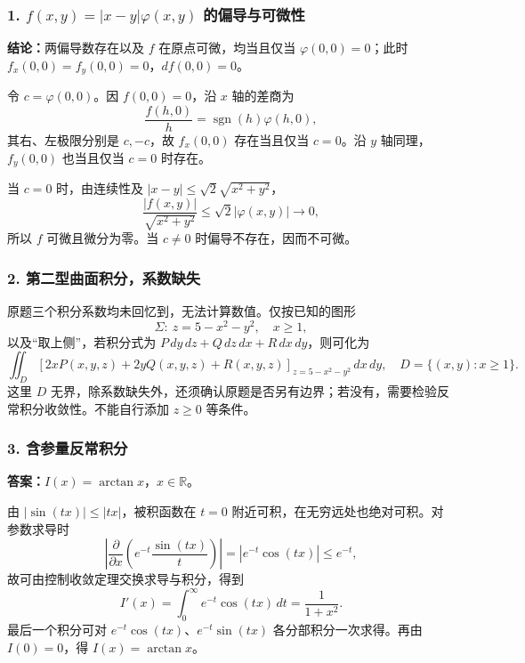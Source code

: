 \documentclass[11pt,fontset=fandol]{ctexart}
\begin{document}
\subsubsection{\texorpdfstring{1. \(f(x,y)=|x-y|\varphi(x,y)\)
的偏导与可微性}{1. f(x,y)=\textbar x-y\textbar\textbackslash varphi(x,y) 的偏导与可微性}}\label{fxyx-yvarphixy-ux7684ux504fux5bfcux4e0eux53efux5faeux6027}

\textbf{结论：}两偏导数存在以及 \(f\) 在原点可微，均当且仅当
\(\varphi(0,0)=0\)；此时 \(f_x(0,0)=f_y(0,0)=0\)，\(df(0,0)=0\)。

令 \(c=\varphi(0,0)\)。因 \(f(0,0)=0\)，沿 \(x\) 轴的差商为 \[
\frac{f(h,0)}h=\operatorname{sgn}(h)\varphi(h,0),
\] 其右、左极限分别是 \(c,-c\)，故 \(f_x(0,0)\) 存在当且仅当 \(c=0\)。沿
\(y\) 轴同理，\(f_y(0,0)\) 也当且仅当 \(c=0\) 时存在。

当 \(c=0\) 时，由连续性及 \(|x-y|\le\sqrt2\sqrt{x^2+y^2}\)， \[
\frac{|f(x,y)|}{\sqrt{x^2+y^2}}
\le\sqrt2|\varphi(x,y)|\to0,
\] 所以 \(f\) 可微且微分为零。当 \(c\ne0\) 时偏导不存在，因而不可微。

\subsubsection{2.
第二型曲面积分，系数缺失}\label{ux7b2cux4e8cux578bux66f2ux9762ux79efux5206ux7cfbux6570ux7f3aux5931}

原题三个积分系数均未回忆到，无法计算数值。仅按已知的图形 \[
\Sigma:\ z=5-x^2-y^2,\quad x\ge1,
\] 以及``取上侧''，若积分式为
\(P\,dy\,dz+Q\,dz\,dx+R\,dx\,dy\)，则可化为 \[
\iint_D[2xP(x,y,z)+2yQ(x,y,z)+R(x,y,z)]_{z=5-x^2-y^2}\,dx\,dy,
\quad D=\{(x,y):x\ge1\}.
\] 这里 \(D\)
无界，除系数缺失外，还须确认原题是否另有边界；若没有，需要检验反常积分收敛性。不能自行添加
\(z\ge0\) 等条件。

\subsubsection{3.
含参量反常积分}\label{ux542bux53c2ux91cfux53cdux5e38ux79efux5206}

\textbf{答案：}\(I(x)=\arctan x\)，\(x\in\mathbb R\)。

由 \(|\sin(tx)|\le|tx|\)，被积函数在 \(t=0\)
附近可积，在无穷远处也绝对可积。对参数求导时 \[
\left|\frac\partial{\partial x}\left(e^{-t}\frac{\sin(tx)}t\right)\right|
=|e^{-t}\cos(tx)|\le e^{-t},
\] 故可由控制收敛定理交换求导与积分，得到 \[
I'(x)=\int_0^\infty e^{-t}\cos(tx)\,dt=\frac1{1+x^2}.
\] 最后一个积分可对 \(e^{-t}\cos(tx)\)、\(e^{-t}\sin(tx)\)
各分部积分一次求得。再由 \(I(0)=0\)，得 \(I(x)=\arctan x\)。
\end{document}
